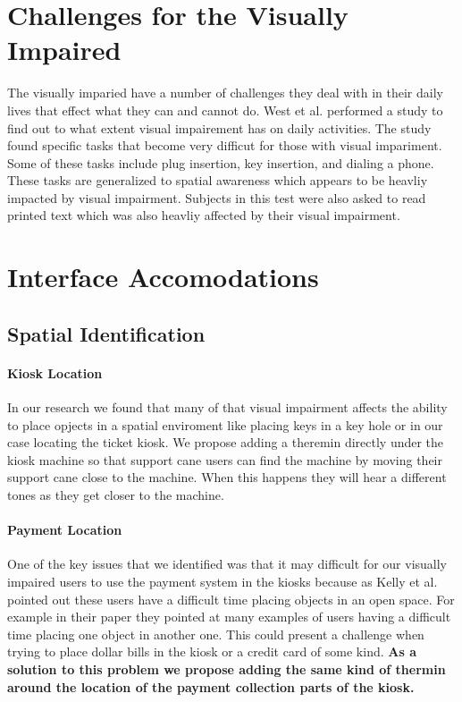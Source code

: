 \documentclass{article}
\begin{document}
    \section{Challenges for the Visually Impaired}
        The visually imparied have a number of challenges they deal with in their 
        daily lives that effect what they can and cannot do. West et al. performed a study
        to find out to what extent visual impairement has on daily activities. The study found
        specific tasks that become very difficut for those with visual impariment. Some of these
        tasks include plug insertion, key insertion, and dialing a phone\cite{doi:10.1001/archopht.120.6.774}. 
        These tasks are generalized to spatial awareness which appears to be heavliy impacted by visual impairment.
        Subjects in this test were also asked to read printed text which was also heavliy affected by their
        visual impairment.


    \section{Interface Accomodations}
        \subsection{Spatial Identification}
            \paragraph{Kiosk Location} In our research we found that many of that visual impairment affects the 
            ability to place opjects in a spatial enviroment like placing keys in a key hole or in our case
            locating the ticket kiosk. We propose adding a theremin directly under the kiosk machine so that
            support cane users can find the machine by moving their support cane close to the machine. When this
            happens they will hear a different tones as they get closer to the machine.
            

            \paragraph{Payment Location}
                One of the key issues that we identified was that it may difficult for our visually impaired users
                to use the payment system in the kiosks because as Kelly et al. pointed out these users have a 
                difficult time placing objects in an open space\cite{doi:10.1001/archopht.120.6.774}. 
                For example in their paper they pointed at many examples of users having a difficult time placing
                one object in another one. This could present a challenge when trying to place dollar bills in the
                kiosk or a credit card of some kind. \textbf{As a solution to this problem we propose adding the
                same kind of thermin around the location of the payment collection parts of the kiosk.} 
\end{document}
